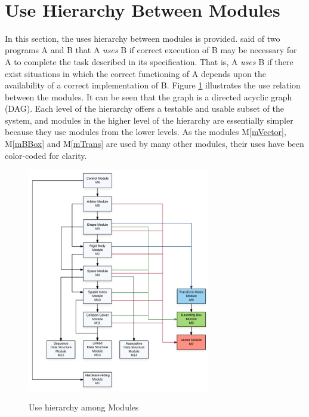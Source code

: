 \documentclass[12pt]{article}
\begin{document}
~\newpage

\section{Use Hierarchy Between Modules} \label{SecUse}

In this section, the uses hierarchy between modules is
provided. \citet{Parnas1978} said of two programs A and B that A {\em uses} B if correct execution of B may be necessary for A to complete the task described in its specification. That is, A {\em uses} B if there exist situations in which the correct functioning of A depends upon the availability of a correct implementation of B.  Figure \ref{Fig_uses} illustrates the use relation between the modules. It can be seen that the graph is a directed acyclic graph (DAG). Each level of the hierarchy offers a testable and usable subset of the system, and modules in the higher level of the hierarchy are essentially simpler because they use modules from the lower levels. As the modules M\ref{mVector}, M\ref{mBBox} and M\ref{mTrans} are used by many other modules, their uses have been color-coded for clarity.

\begin{figure}[htbp]
\begin{center}
{
 \includegraphics[width=0.71\textwidth]{uses}
}
\caption{\label{Fig_uses}Use hierarchy among Modules}
\end{center}
\end{figure}
\end{document}
